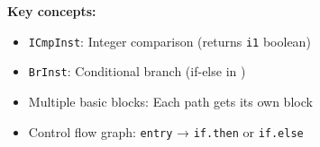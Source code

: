 \textbf{Key concepts:}
\begin{itemize}[noitemsep]
  \item \texttt{ICmpInst}: Integer comparison (returns \texttt{i1} boolean)
  \item \texttt{BrInst}: Conditional branch (if-else in )
  \item Multiple basic blocks: Each path gets its own block
  \item Control flow graph: \texttt{entry} → \texttt{if.then} or \texttt{if.else}
\end{itemize}

